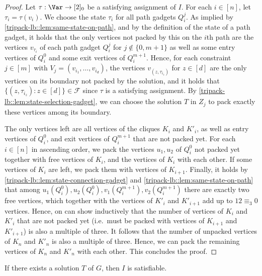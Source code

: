 \documentclass[a4paper,UKenglish,cleveref, autoref, thm-restate]{lipics-v2021}
\begin{document}
\begin{proof}
    Let $\tau:\Var \rightarrow [2]_0$ be a satisfying assignment of $I$. For each $i\in[n]$, let $\tau_i = \tau(v_i)$. We choose the state $\tau_i$ for all path gadgets $Q_i^j$. 
    As implied by \cref{tripack-lb::lem:same-state-on-path}, and by the definition of the state of a path gadget,
    it holds that the only vertices not packed by this on the $i$th path are the vertices $v_{\tau_i}$ of each path gadget $Q_i^j$ for $j\notin\{0,m+1\}$ as well as some entry vertices of $Q_i^0$ and some exit vertices of $Q_i^{m+1}$.
    Hence, for each constraint $j \in [m]$ with $V_j = (v_{i_1}, \dots, v_{i_d})$,
    the vertices $v_{(z, \tau_{i_z})}$ for $z\in[d]$ are the only vertices on its boundary not packed by the solution, and it holds that $\{(z, \tau_{i_z})\colon z\in[d]\} \in \mathcal{F}$ since $\tau$ is a satisfying assignment.
    By \cref{tripack-lb::lem:state-selection-gadget}, we can choose the solution $T$ in $Z_j$ to pack exactly these vertices among its boundary.

    The only vertices left are all vertices of the cliques $K_i$ and $K'_i$, as well as entry vertices of $Q_i^0$, and exit vertices of $Q_i^{m+1}$ that are not packed yet. 
    For each $i\in[n]$ in ascending order, we pack the vertices $u_1, u_2$ of $Q_i^0$ not packed yet together with free vertices of $K_i$, and the vertices of $K_i$ with each other. 
    If some vertices of $K_i$ are left, we pack them with vertices of $K_{i+1}$. Finally, it holds by \cref{tripack-lb::lem:state-connection-gadget} and \cref{tripack-lb::lem:same-state-on-path} that among $u_1(Q_i^{0}), u_2(Q_i^{0}), v_1(Q_i^{m+1}), v_2(Q_i^{m+1})$ there are exactly two free
    vertices, which together with the vertices of $K'_i$ and $K'_{i+1}$ add up to $12\equiv_3 0$ vertices. Hence, on can show inductively that the number of vertices of $K_i$ and $K'_i$ that are not packed yet
    (i.e.\ must be packed with vertices of $K_{i+1}$ and $K'_{i+1}$) is also a multiple of three. It follows that the number of unpacked vertices of $K_n$ and $K'_n$ is also a multiple of three. Hence, we can pack the remaining vertices of $K_n$ and $K'_n$ with each other. This concludes the proof.
\end{proof}

\begin{lemma}
    If there exists a solution $T$ of $G$, then $I$ is satisfiable.
\end{lemma}
\end{document}
